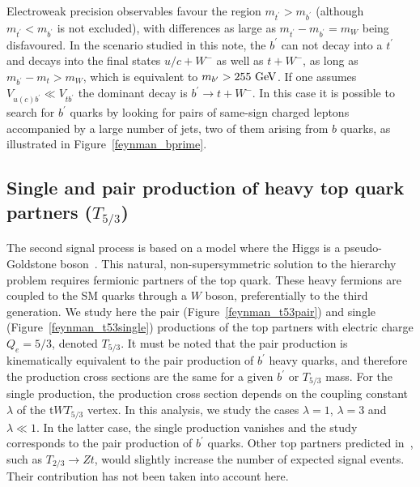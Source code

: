 Electroweak precision observables favour the region $m_{t^\prime}>m_{b^\prime}$ 
(although $m_{t^\prime}<m_{b^\prime}$ is not excluded), with differences as large 
as $m_{t^\prime}-m_{b^\prime}=m_{W}$ being disfavoured. In the scenario studied in this
note, the $b^\prime$ can not decay into a $t^\prime$ and decays into the 
final states $u/c+W^{-}$ as well as $t+W^{-}$, as long as $m_{b^\prime}-m_{t}> m_W$, which is equivalent 
to $m_{b^\prime} > 255 \GeV{}$. If one assumes $V_{u(c) b^\prime}\ll V_{t b^\prime}$ the dominant decay is 
$b^\prime \rightarrow t+ W^{-}$. In this case it is possible to search for $b^\prime$ 
quarks by looking for pairs of same-sign charged leptons accompanied by a large number of jets,
two of them arising from $b$ quarks, as illustrated in Figure~\ref{feynman_bprime}.

\subsection{Single and pair production of heavy top quark partners ($T_{5/3}$)}
The second signal process is based on a model where the Higgs is a pseudo-Goldstone 
boson~\cite{Contino:2008hi}. This natural, non-supersymmetric solution to the hierarchy 
problem requires fermionic partners of the top quark. 
These heavy fermions are coupled to the SM quarks through a $W$ boson,
preferentially to the third generation.
We study here the pair (Figure~\ref{feynman_t53pair}) and single (Figure~\ref{feynman_t53single}) 
productions of the top partners with electric charge $Q_{e}=5/3$, denoted $T_{5/3}$. It must be
noted that the pair production is kinematically equivalent to the pair production
of $b^\prime$ heavy quarks, and therefore the production cross sections are the same
for a given $b^\prime$ or $T_{5/3}$ mass. For the single production, the production 
cross section depends on the coupling constant $\lambda$ of the t$WT_{5/3}$ vertex.
In this analysis, we study the cases $\lambda=1$, $\lambda=3$ and $\lambda\ll 1$. In the
latter case, the single production vanishes and the study corresponds to the pair production
of $b^\prime$ quarks. 
Other top partners predicted in~\cite{Contino:2008hi}, such as $T_{2/3} \rightarrow Zt$, would slightly 
increase the number of expected signal events. Their contribution has
not been taken into account here.

